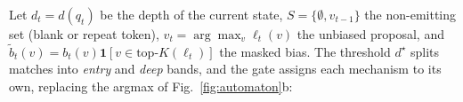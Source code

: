 \documentclass{article}
\begin{document}






Let $d_t=d(q_t)$ be the depth of the current state, $S=\{\emptyset, v_{t-1}\}$ the non-emitting set (blank or repeat token), $\hat{v}_t = \arg\max_v \ell_t(v)$ the unbiased proposal, and $\tilde{b}_t(v) = b_t(v)\mathbf{1}[v \in \text{top-}K(\ell_t)]$ the masked bias. The threshold $d^\star$ splits matches into \textit{entry} and \textit{deep} bands, and the gate assigns each mechanism to its own, replacing the argmax of Fig.~\ref{fig:automaton}b:
\end{document}

